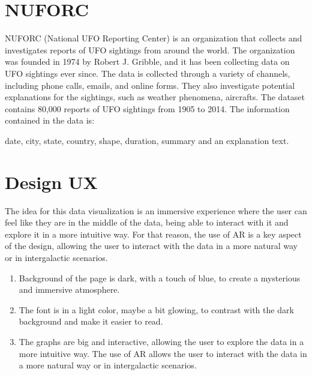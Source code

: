 \documentclass[fleqn,10pt]{SelfArx} %
\begin{document}
\maketitle %

\tableofcontents %

\thispagestyle{empty} %

\section{NUFORC}
NUFORC (National UFO Reporting Center) is an organization that collects and investigates reports of UFO sightings from around the world. 
The organization was founded in 1974 by Robert J. Gribble, and it has been collecting data on UFO sightings ever since. The data is collected through a variety of channels, including phone calls, emails, and online forms.
They also investigate potential explanations for the sightings, such as weather phenomena, aircrafts.
The dataset contains 80,000 reports of UFO sightings from 1905 to 2014. The information contained in the data is:

date, city, state, country, shape, duration, summary and an explanation text.

\newpage %
\section{Design UX}

The idea for this data visualization is an immersive experience where the user can feel like they are in the middle of the data, being able to interact with it and explore it in a more intuitive way.
For that reason, the use of AR is a key aspect of the design, allowing the user to interact with the data in a more natural way or in intergalactic scenarios.

\begin{enumerate}[noitemsep] %
\item Background of the page is dark, with a touch of blue, to create a mysterious and immersive atmosphere.
\item The font is in a light color, maybe a bit glowing, to contrast with the dark background and make it easier to read.
\item The graphs are big and interactive, allowing the user to explore the data in a more intuitive way. The use of AR allows the user to interact with the data in a more natural way or in intergalactic scenarios.
\end{enumerate}
\end{document}

